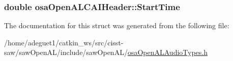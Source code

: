 \hypertarget{structosa_open_a_l_c_a_i_header_a997c67e3b4e503cd6a374bc26c4151d9}{
\subsubsection[{Start\-Time}]{\setlength{\rightskip}{0pt plus 5cm}double osa\-Open\-A\-L\-C\-A\-I\-Header\-::\-Start\-Time}}\label{structosa_open_a_l_c_a_i_header_a997c67e3b4e503cd6a374bc26c4151d9}


The documentation for this struct was generated from the following file\-:\begin{DoxyCompactItemize}
\item 
/home/adeguet1/catkin\-\_\-ws/src/cisst-\/saw/saw\-Open\-A\-L/include/saw\-Open\-A\-L/\hyperlink{osa_open_a_l_audio_types_8h}{osa\-Open\-A\-L\-Audio\-Types.\-h}\end{DoxyCompactItemize}
